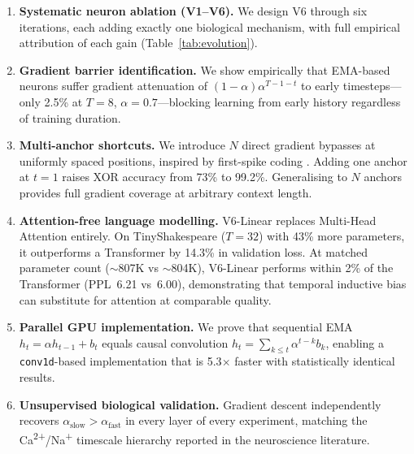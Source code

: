 \documentclass[11pt,a4paper]{article}
\begin{document}
\begin{enumerate}[leftmargin=*, label=(\arabic*)]

\item \textbf{Systematic neuron ablation (V1--V6).}
  We design V6 through six iterations, each adding exactly one
  biological mechanism, with full empirical attribution of each gain
  (Table~\ref{tab:evolution}).

\item \textbf{Gradient barrier identification.}
  We show empirically that EMA-based neurons suffer gradient
  attenuation of $(1-\alpha)\alpha^{T-1-t}$ to early timesteps---only
  2.5\% at $T=8$, $\alpha=0.7$---blocking learning from early history
  regardless of training duration.

\item \textbf{Multi-anchor shortcuts.}
  We introduce $N$ direct gradient bypasses at uniformly spaced
  positions, inspired by first-spike coding \citep{thorpe2001spike}.
  Adding one anchor at $t=1$ raises XOR accuracy from 73\% to 99.2\%.
  Generalising to $N$ anchors provides full gradient coverage at
  arbitrary context length.

\item \textbf{Attention-free language modelling.}
  V6-Linear replaces Multi-Head Attention entirely.
  On TinyShakespeare ($T=32$) with 43\% more parameters, it outperforms
  a Transformer by 14.3\% in validation loss.
  At matched parameter count ($\sim$807K vs $\sim$804K), V6-Linear
  performs within 2\% of the Transformer (PPL~6.21 vs~6.00),
  demonstrating that temporal inductive bias can substitute for
  attention at comparable quality.

\item \textbf{Parallel GPU implementation.}
  We prove that sequential EMA $h_t = \alpha h_{t-1} + b_t$
  equals causal convolution $h_t = \sum_{k\leq t}\alpha^{t-k}b_k$,
  enabling a \texttt{conv1d}-based implementation that is
  5.3$\times$ faster with statistically identical results.

\item \textbf{Unsupervised biological validation.}
  Gradient descent independently recovers
  $\alpha_\mathrm{slow} > \alpha_\mathrm{fast}$ in every layer of
  every experiment, matching the Ca\textsuperscript{2+}/Na\textsuperscript{+}
  timescale hierarchy reported in the neuroscience literature.

\end{enumerate}

\end{document}
